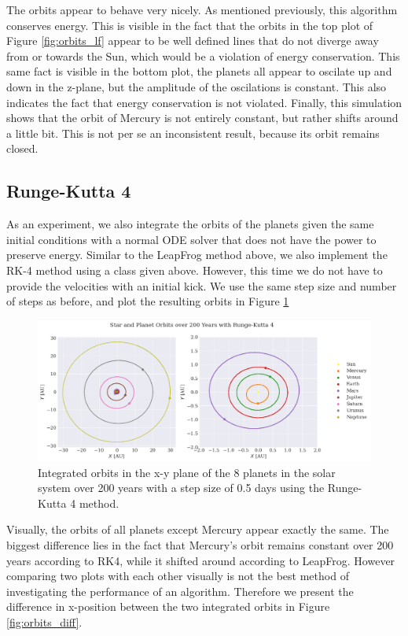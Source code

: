 The orbits appear to behave very nicely. As mentioned previously, this algorithm conserves energy. This is visible in the fact that the orbits in the top plot of Figure \ref{fig:orbits_lf} appear to be well defined lines that do not diverge away from or towards the Sun, which would be a violation of energy conservation. This same fact is visible in the bottom plot, the planets all appear to oscilate up and down in the z-plane, but the amplitude of the oscilations is constant. This also indicates the fact that energy conservation is not violated. Finally, this simulation shows that the orbit of Mercury is not entirely constant, but rather shifts around a little bit. This is not per se an inconsistent result, because its orbit remains closed.

\subsection{Runge-Kutta 4}

As an experiment, we also integrate the orbits of the planets given the same initial conditions with a normal ODE solver that does not have the power to preserve energy. Similar to the LeapFrog method above, we also implement the RK-4 method using a class given above. However, this time we do not have to provide the velocities with an initial kick. We use the same step size and number of steps as before, and plot the resulting orbits in Figure \ref{fig:orbits_rk4}

\begin{figure}
    \centering
    \includegraphics[width=\textwidth]{results/orbits_rk4.png}
    \caption{Integrated orbits in the x-y plane of the 8 planets in the solar system over 200 years with a step size of 0.5 days using the Runge-Kutta 4 method.}
    \label{fig:orbits_rk4}
\end{figure}

Visually, the orbits of all planets except Mercury appear exactly the same. The biggest difference lies in the fact that Mercury's orbit remains constant over 200 years according to RK4, while it shifted around according to LeapFrog. However comparing two plots with each other visually is not the best method of investigating the performance of an algorithm. Therefore we present the difference in x-position between the two integrated orbits in Figure \ref{fig:orbits_diff}. 

